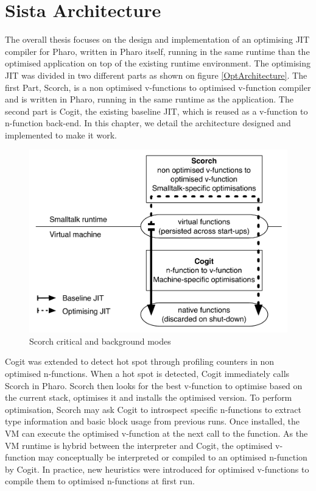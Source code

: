 \documentclass[a4paper,12pt,twoside]{../includes/ThesisStyle}
\begin{document}
\fi

\chapter{Sista Architecture}
\label{chap:architecture}
\minitoc

The overall thesis focuses on the design and implementation of an optimising JIT compiler for Pharo, written in Pharo itself, running in the same runtime than the optimised application on top of the existing runtime environment. The optimising JIT was divided in two different parts as shown on figure \ref{OptArchitecture}. The first Part, Scorch, is a non optimised v-functions to optimised v-function compiler and is written in Pharo, running in the same runtime as the application. The second part is Cogit, the existing baseline JIT, which is reused as a v-function to n-function back-end. In this chapter, we detail the architecture designed and implemented to make it work.

\begin{figure}[h!]
    \begin{center}
        \includegraphics[width=0.8\linewidth]{OptArchitecture}
        \caption{Scorch critical and background modes}
        \label{fig:ScorchModes}
    \end{center}
\end{figure}

Cogit was extended to detect hot spot through profiling counters in non optimised n-functions. When a hot spot is detected, Cogit immediately calls Scorch in Pharo. Scorch then looks for the best v-function to optimise based on the current stack, optimises it and installs the optimised version. To perform optimisation, Scorch may ask Cogit to introspect specific n-functions to extract type information and basic block usage from previous runs. Once installed, the VM can execute the optimised v-function at the next call to the function. As the VM runtime is hybrid between the interpreter and Cogit, the optimised v-function may conceptually be interpreted or compiled to an optimised n-function by Cogit. In practice, new heuristics were introduced for optimised v-functions to compile them to optimised n-functions at first run.
\end{document}
